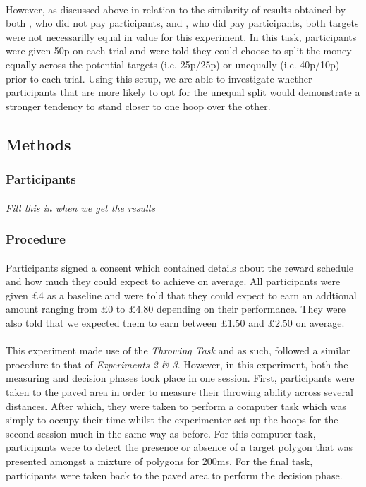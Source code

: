 \documentclass[12pt]{article}
\begin{document}
\paragraph{} However, as discussed above in relation to the similarity of results obtained by both \cite{clarke2015failure}, who did not pay participants, and \cite{morvan2012human}, who did pay participants, both targets were not necessarilly equal in value for this experiment. In this task, participants were given 50p on each trial and were told they could choose to split the money equally across the potential targets (i.e. 25p/25p) or unequally (i.e. 40p/10p) prior to each trial. Using this setup, we are able to investigate whether participants that are more likely to opt for the unequal split would demonstrate a stronger tendency to stand closer to one hoop over the other.  

\subsection*{Methods}
\subsubsection*{Participants}
\paragraph{} \textit{Fill this in when we get the results}

\subsubsection*{Procedure} 
\paragraph{} Participants signed a consent which contained details about the reward schedule and how much they could expect to achieve on average. All participants were given £4 as a baseline and were told that they could expect to earn an addtional amount ranging from £0 to £4.80 depending on their performance. They were also told that we expected them to earn between £1.50 and £2.50 on average.  

\paragraph{} This experiment made use of the \textit{Throwing Task} and as such, followed a similar procedure to that of \textit{Experiments 2 \& 3}. However, in this experiment, both the measuring and decision phases took place in one session. First, participants were taken to the paved area in order to measure their throwing ability across several distances. After which, they were taken to perform a computer task which was simply to occupy their time whilst the experimenter set up the hoops for the second session much in the same way as before. For this computer task, participants were to detect the presence or absence of a target polygon that was presented amongst a mixture of polygons for 200ms. For the final task, participants were taken back to the paved area to perform the decision phase. 
\end{document}

